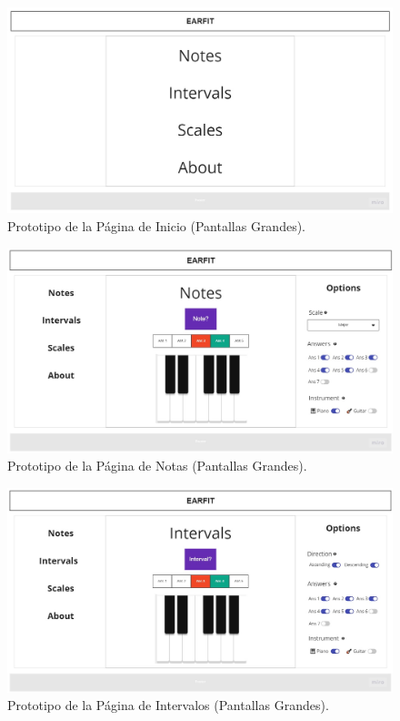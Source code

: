 \documentclass[12pt,twoside,titlepage]{report}
\begin{document}
{\begin{figure}[H]
    \centering
    \includegraphics[scale=0.3]{Design Thinking/Prototipo/Large/Menu}
    \caption{Prototipo de la Página de Inicio (Pantallas Grandes).}
    \label{fig:MenuLarge}
\end{figure}

\begin{figure}[H]
    \centering
    \includegraphics[scale=0.29]{Design Thinking/Prototipo/Large/Notes}
    \caption{Prototipo de la Página de Notas (Pantallas Grandes).}
    \label{fig:NotesLarge}
\end{figure}

\begin{figure}[H]
    \centering
    \includegraphics[scale=0.29]{Design Thinking/Prototipo/Large/Intervals}
    \caption{Prototipo de la Página de Intervalos (Pantallas Grandes).}
    \label{fig:IntervalsLarge}
\end{figure}

}
\end{document}
